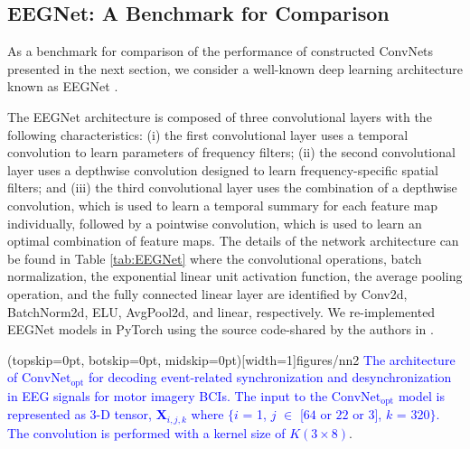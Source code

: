 \documentclass{ieeeaccess}
\begin{document}
    
    \subsection{EEGNet: A Benchmark for Comparison}
    \label{sec:EEGnet}
    As a benchmark for comparison of the performance of constructed ConvNets presented in the next section, we consider a well-known deep learning architecture known as EEGNet \cite{lawhern2016eegnet}.
    
    The EEGNet architecture is composed of three convolutional layers with the following characteristics: (i) the first convolutional layer uses a temporal convolution to learn parameters of frequency filters; (ii) the second convolutional layer uses a depthwise convolution designed to learn frequency-specific spatial filters; and (iii) the third convolutional layer uses the combination of a depthwise convolution,  which is used to learn a temporal summary for each feature map individually, followed by a pointwise convolution, which is used to learn an optimal combination of feature maps. The details of the network architecture can be found in Table \ref{tab:EEGNet} where the convolutional operations,  batch normalization,  the exponential linear unit activation function, the average pooling operation, and the fully connected linear layer are identified by Conv2d,  BatchNorm2d,  ELU,  AvgPool2d,  and linear,  respectively. We re-implemented EEGNet models in PyTorch using the source code-shared by the authors in \cite{lawhern2016eegnet}. 
    
    \Figure[t!](topskip=0pt, botskip=0pt, midskip=0pt)[width=1\linewidth]{figures/nn2}
    {\textcolor{blue}{The architecture of $\text{ConvNet}_{\text{opt}}$ for decoding event-related synchronization and desynchronization in EEG signals for motor imagery BCIs. The input to the $\text{ConvNet}_{\text{opt}}$ model is represented as 3-D tensor, $\mathbf{\mathbf{X}}_{i, j, k}$ where $\{i$ = 1, $ j$ $\in$ [$64$  or  $22$  or  $3$], $k$ = 320$\}$. The convolution is performed with a kernel size of $K(3 \times 8)$}.  \label{fig:figerders}}
    
\end{document}
